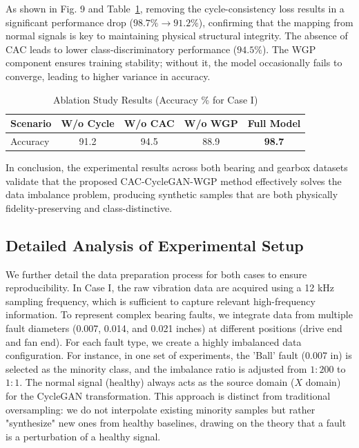 As shown in Fig. 9 and Table~\ref{tab:ablation}, removing the cycle-consistency loss results in a significant performance drop ($98.7\% \to 91.2\%$), confirming that the mapping from normal signals is key to maintaining physical structural integrity. The absence of CAC leads to lower class-discriminatory performance ($94.5\%$). The WGP component ensures training stability; without it, the model occasionally fails to converge, leading to higher variance in accuracy.

\begin{table}[htbp]
\centering
\caption{Ablation Study Results (Accuracy \% for Case I)}
\label{tab:ablation}
\begin{tabular}{lcccc}
\hline
\textbf{Scenario} & W/o Cycle & W/o CAC & W/o WGP & \textbf{Full Model} \\ \hline
Accuracy & 91.2 & 94.5 & 88.9 & \textbf{98.7} \\
\hline
\end{tabular}
\end{table}

In conclusion, the experimental results across both bearing and gearbox datasets validate that the proposed CAC-CycleGAN-WGP method effectively solves the data imbalance problem, producing synthetic samples that are both physically fidelity-preserving and class-distinctive.

\subsection{Detailed Analysis of Experimental Setup}
We further detail the data preparation process for both cases to ensure reproducibility. In Case I, the raw vibration data are acquired using a 12 kHz sampling frequency, which is sufficient to capture relevant high-frequency information. To represent complex bearing faults, we integrate data from multiple fault diameters (0.007, 0.014, and 0.021 inches) at different positions (drive end and fan end). For each fault type, we create a highly imbalanced data configuration. For instance, in one set of experiments, the 'Ball' fault (0.007 in) is selected as the minority class, and the imbalance ratio is adjusted from $1:200$ to $1:1$. The normal signal (healthy) always acts as the source domain ($X$ domain) for the CycleGAN transformation. This approach is distinct from traditional oversampling: we do not interpolate existing minority samples but rather "synthesize" new ones from healthy baselines, drawing on the theory that a fault is a perturbation of a healthy signal.


